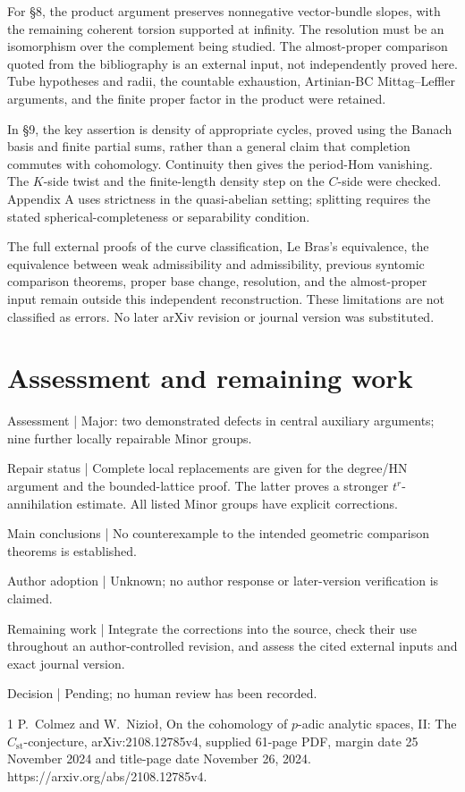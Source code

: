 \documentclass[10pt]{article}
\begin{document}
For §8, the product argument preserves nonnegative vector-bundle slopes, with the remaining coherent torsion supported at infinity. The resolution must be an isomorphism over the complement being studied. The almost-proper comparison quoted from the bibliography is an external input, not independently proved here. Tube hypotheses and radii, the countable exhaustion, Artinian-BC Mittag–Leffler arguments, and the finite proper factor in the product were retained.\par
In §9, the key assertion is density of appropriate cycles, proved using the Banach basis and finite partial sums, rather than a general claim that completion commutes with cohomology. Continuity then gives the period-Hom vanishing. The \(K\)-side twist and the finite-length density step on the \(C\)-side were checked. Appendix A uses strictness in the quasi-abelian setting; splitting requires the stated spherical-completeness or separability condition.\par
The full external proofs of the curve classification, Le Bras’s equivalence, the equivalence between weak admissibility and admissibility, previous syntomic comparison theorems, proper base change, resolution, and the almost-proper input remain outside this independent reconstruction. These limitations are not classified as errors. No later arXiv revision or journal version was substituted.\par
\section*{Assessment and remaining work}
Assessment | Major: two demonstrated defects in central auxiliary arguments; nine further locally repairable Minor groups.\par
Repair status | Complete local replacements are given for the degree/HN argument and the bounded-lattice proof. The latter proves a stronger \(t^r\)-annihilation estimate. All listed Minor groups have explicit corrections.\par
Main conclusions | No counterexample to the intended geometric comparison theorems is established.\par
Author adoption | Unknown; no author response or later-version verification is claimed.\par
Remaining work | Integrate the corrections into the source, check their use throughout an author-controlled revision, and assess the cited external inputs and exact journal version.\par
Decision | Pending; no human review has been recorded.\par
1 P. Colmez and W. Nizioł, On the cohomology of \(p\)-adic analytic spaces, II: The \(C_{\mathrm{st}}\)-conjecture, arXiv:2108.12785v4, supplied 61-page PDF, margin date 25 November 2024 and title-page date November 26, 2024. https://arxiv.org/abs/2108.12785v4.\par
\end{document}
